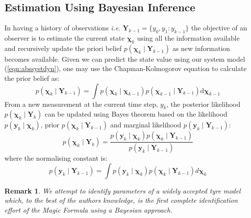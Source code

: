 \documentclass[onecolumn,journal,draftclsnofoot]{IEEEtran}
\newtheorem{remark}{Remark}
\begin{document}
\subsection{Estimation Using Bayesian Inference}

In having a history of observations \emph{i.e.} \(\mathbf{Y}_{k-1} = \{y_0, y_1: y_{k-1}\} \) the objective of an observer is to estimate the current state \(\mathbf{\chi}_k\) using all the information available and recursively update the priori belief \(p\left(\mathbf{\chi}_k \mid \mathbf{Y}_{k-1} \right) \) as new information becomes available. 
Given we can predict the state value using our system model (\ref{eqn:abssystdyn}), one may use the Chapman-Kolmogorov equation to calculate the prior belief as:
\begin{equation}
    p\left(\mathbf{\chi}_k \mid \mathbf{Y}_{k-1}\right)=\int p\left(\mathbf{\chi}_k \mid \mathbf{\chi}_{k-1}\right) p\left(\mathbf{\chi}_{k-1} \mid \mathbf{Y}_{k-1}\right) \mathrm{d} \mathbf{\chi}_{k-1}
\end{equation}
From a new measurement at the current time step, \(y_k\), the posterior likelihood \(p\left(\mathbf{\chi}_k \mid \mathbf{Y}_{k} \right) \) can be updated using Bayes theorem based on the likelihood \(p\left( \mathbf{y}_{k} \mid \mathbf{\chi}_k \right)\), prior \(p\left( \mathbf{\chi}_k \mid \mathbf{Y}_{k-1} \right)\) and marginal likelihood \(p\left( \mathbf{y}_{k} \mid \mathbf{Y}_{k-1} \right)\):
\begin{equation} \label{eqn:prior}
    p\left(\mathbf{\chi}_k \mid \mathbf{Y}_{k} \right) = \frac{p\left( \mathbf{y}_{k} \mid \mathbf{\chi}_k \right) p\left( \mathbf{\chi}_k \mid \mathbf{Y}_{k-1} \right) }{p\left( \mathbf{y}_{k} \mid \mathbf{Y}_{k-1} \right)}
\end{equation}
where the normalising constant is:
\begin{equation}
p\left(\mathbf{y}_k \mid \mathbf{Y}_{k-1}\right)=\int p\left(\mathbf{y}_k \mid \mathbf{\chi}_k\right) p\left(\mathbf{\chi}_k \mid \mathbf{Y}_{k-1}\right) d \mathbf{\chi}_k
\end{equation}
\begin{remark}
We attempt to identify parameters of a widely accepted tyre model which, to the best of the authors knowledge, is the first complete identification effort of the Magic Formula using a Bayesian approach.
\end{remark}
\end{document}
